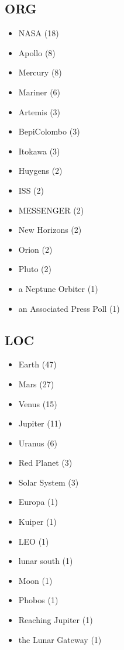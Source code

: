 \documentclass[12pt]{article}
\begin{document}
\subsection*{ORG}
\begin{itemize}
\item NASA (18)
\item Apollo (8)
\item Mercury (8)
\item Mariner (6)
\item Artemis (3)
\item BepiColombo (3)
\item Itokawa (3)
\item Huygens (2)
\item ISS (2)
\item MESSENGER (2)
\item New Horizons (2)
\item Orion (2)
\item Pluto (2)
\item a Neptune Orbiter (1)
\item an Associated Press Poll (1)
\end{itemize}

\subsection*{LOC}
\begin{itemize}
\item Earth (47)
\item Mars (27)
\item Venus (15)
\item Jupiter (11)
\item Uranus (6)
\item Red Planet (3)
\item Solar System (3)
\item Europa (1)
\item Kuiper (1)
\item LEO (1)
\item lunar south (1)
\item Moon (1)
\item Phobos (1)
\item Reaching Jupiter (1)
\item the Lunar Gateway (1)
\end{itemize}
\end{document}
